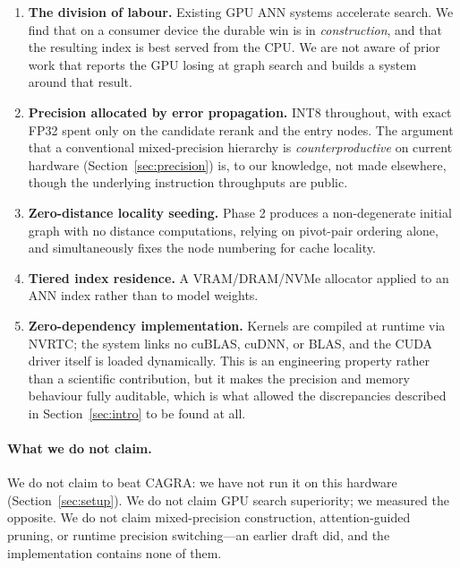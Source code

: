 \documentclass[11pt,twocolumn]{article}
\begin{document}
\begin{enumerate}[nosep]
    \item \textbf{The division of labour.} Existing GPU ANN systems accelerate
    search. We find that on a consumer device the durable win is in
    \emph{construction}, and that the resulting index is best served from the
    CPU. We are not aware of prior work that reports the GPU losing at graph
    search and builds a system around that result.

    \item \textbf{Precision allocated by error propagation.} INT8 throughout,
    with exact FP32 spent only on the candidate rerank and the entry nodes. The
    argument that a conventional mixed-precision hierarchy is
    \emph{counterproductive} on current hardware (Section~\ref{sec:precision})
    is, to our knowledge, not made elsewhere, though the underlying instruction
    throughputs are public.

    \item \textbf{Zero-distance locality seeding.} Phase 2 produces a
    non-degenerate initial graph with no distance computations, relying on
    pivot-pair ordering alone, and simultaneously fixes the node numbering for
    cache locality.

    \item \textbf{Tiered index residence.} A VRAM/DRAM/NVMe allocator applied to
    an ANN index rather than to model weights.

    \item \textbf{Zero-dependency implementation.} Kernels are compiled at
    runtime via NVRTC; the system links no cuBLAS, cuDNN, or BLAS, and the CUDA
    driver itself is loaded dynamically. This is an engineering property rather
    than a scientific contribution, but it makes the precision and memory
    behaviour fully auditable, which is what allowed the discrepancies described
    in Section~\ref{sec:intro} to be found at all.
\end{enumerate}

\paragraph{What we do not claim.} We do not claim to beat CAGRA: we have not run
it on this hardware (Section~\ref{sec:setup}). We do not claim GPU search
superiority; we measured the opposite. We do not claim mixed-precision
construction, attention-guided pruning, or runtime precision switching---an
earlier draft did, and the implementation contains none of them.
\end{document}
